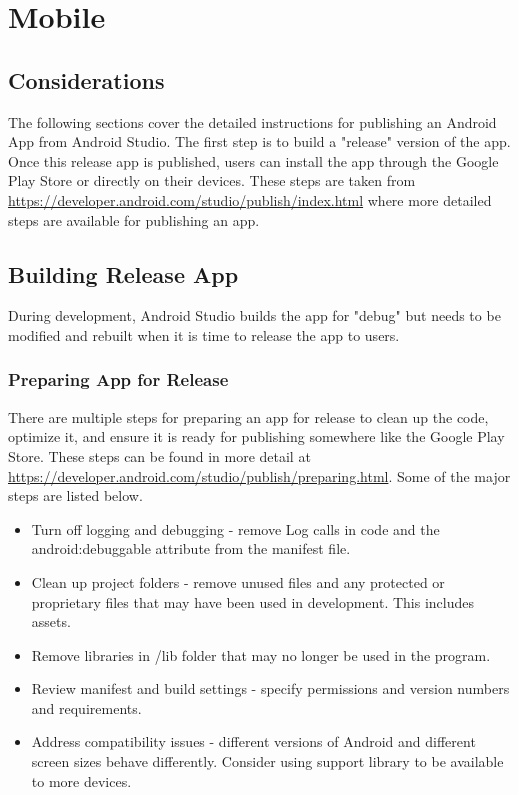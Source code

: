 
\section{Mobile}
\subsection{Considerations}
\tab The following sections cover the detailed instructions for publishing an Android App from Android Studio. The first step is to build a "release" version of the app. Once this release app is published, users can install the app through the Google Play Store or directly on their devices. These steps are taken from \url{https://developer.android.com/studio/publish/index.html} where more detailed steps are available for publishing an app.

\subsection{Building Release App}
During development, Android Studio builds the app for "debug" but needs to be modified and rebuilt when it is time to release the app to users.
\subsubsection{Preparing App for Release}
There are multiple steps for preparing an app for release to clean up the code, optimize it, and ensure it is ready for publishing somewhere like the Google Play Store. These steps can be found in more detail at \url{https://developer.android.com/studio/publish/preparing.html}. Some of the major steps are listed below.
\begin{itemize}
    \item Turn off logging and debugging - remove Log calls in code and the android:debuggable attribute from the manifest file.
    \item Clean up project folders - remove unused files and any protected or proprietary files that may have been used in development. This includes assets.
    \item Remove libraries in /lib folder that may no longer be used in the program.
    \item Review manifest and build settings - specify permissions and version numbers and requirements.
    \item Address compatibility issues - different versions of Android and different screen sizes behave differently. Consider using support library to be available to more devices.
\end{itemize}
